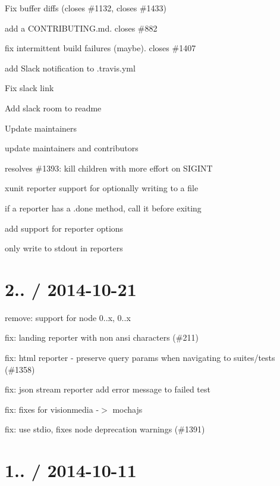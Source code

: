 \begin{DoxyItemize}
\item Fix buffer diffs (closes \#1132, closes \#1433)
\item add a C\+O\+N\+T\+R\+I\+B\+U\+T\+I\+N\+G.\+md. closes \#882
\item fix intermittent build failures (maybe). closes \#1407
\item add Slack notification to .travis.\+yml
\item Fix slack link
\item Add slack room to readme
\item Update maintainers
\item update maintainers and contributors
\item resolves \#1393\+: kill children with more effort on S\+I\+G\+I\+NT
\item xunit reporter support for optionally writing to a file
\item if a reporter has a .done method, call it before exiting
\item add support for reporter options
\item only write to stdout in reporters
\end{DoxyItemize}

\section*{2.. / 2014-\/10-\/21}


\begin{DoxyItemize}
\item remove\+: support for node 0..\+x, 0..\+x
\item fix\+: landing reporter with non ansi characters (\#211)
\item fix\+: html reporter -\/ preserve query params when navigating to suites/tests (\#1358)
\item fix\+: json stream reporter add error message to failed test
\item fix\+: fixes for visionmedia -\/$>$ mochajs
\item fix\+: use stdio, fixes node deprecation warnings (\#1391)
\end{DoxyItemize}

\section*{1.. / 2014-\/10-\/11}



